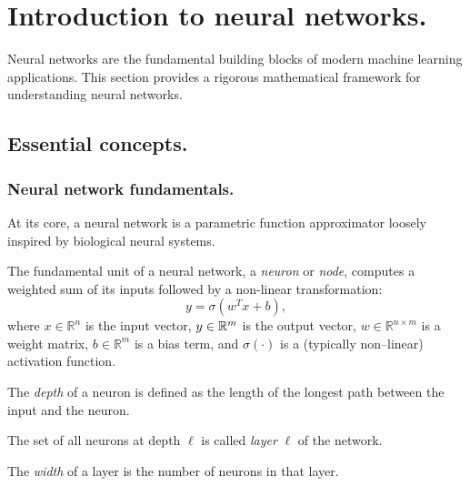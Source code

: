 \section{Introduction to neural networks.}
\sectionminitoc

Neural networks are the fundamental building blocks of modern machine learning applications.
%
This section provides a rigorous mathematical framework for understanding neural networks.

    \subsection{Essential concepts.}
        \subsubsection{Neural network fundamentals.}
            At its core, a neural network is a parametric function approximator loosely inspired by biological neural systems.
            \begin{definition}[Neuron]
            The fundamental unit of a neural network, a \emph{neuron} or \emph{node}, computes a weighted sum of its inputs followed by a non-linear transformation:
            \begin{equation}
            y = \sigma(w^T x + b),
            \end{equation}
            where \(x \in \mathbb{R}^n\) is the input vector, \(y\in\mathbb{R}^{m}\) is the output vector, \(w \in \mathbb{R}^{n\times m}\) is a weight matrix, \(b \in \mathbb{R}^m\) is a bias term, and \(\sigma(\cdot)\) is a (typically non--linear) activation function.
            \end{definition}

            \begin{definition}
            The \emph{depth} of a neuron is defined as the length of the longest path between the input and the neuron.
            \end{definition}

            \begin{definition}
            The set of all neurons at depth \(\ell\) is called \emph{layer} \(\ell\) of the network.
            \end{definition}

            \begin{definition}
            The \emph{width} of a layer is the number of neurons in that layer.
            \end{definition}

